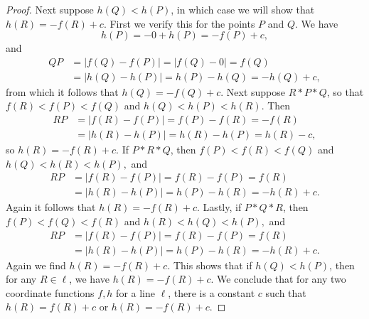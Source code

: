 \documentclass{article}
\begin{document}
\begin{proof}
  Next suppose $h(Q)<h(P)$, in which case we will show that $h(R)=-f(R)+c$. First we verify this for the points $P$ and $Q$. We have $$h(P)=-0+h(P)=-f(P)+c,$$ and 
  \begin{align*} QP&= |f(Q)-f(P)| =|f(Q)-0|= f(Q) \\
  &= |h(Q)-h(P)| =h(P)-h(Q)=-h(Q)+c,\end{align*}  from which it follows that $h(Q)=-f(Q)+c$. Next suppose $R*P*Q$, so that $f(R)<f(P)<f(Q)$ and $h(Q)<h(P)<h(R).$ Then
  \begin{align*} RP &=  |f(R)-f(P)| = f(P)-f(R) = -f(R) \\
  &=|h(R)-h(P)| = h(R)-h(P) =  h(R)-c, \end{align*}  so $h(R)=-f(R)+c$. If $P*R*Q$, then $f(P)<f(R)<f(Q)$ and $h(Q)<h(R)<h(P),$ and 
  \begin{align*} RP &=  |f(R)-f(P)| = f(R)-f(P) = f(R) \\
  &=|h(R)-h(P)| = h(P)-h(R) =  -h(R)+c.\end{align*} Again it follows that $h(R)=-f(R)+c$. Lastly, if $P*Q*R$, then $f(P)<f(Q)<f(R)$ and $h(R)<h(Q)<h(P),$ and
  \begin{align*} RP &=  |f(R)-f(P)| = f(R)-f(P) = f(R) \\
  &=|h(R)-h(P)| = h(P)-h(R) = -h(R)+c. \end{align*} Again we find $h(R)=-f(R)+c$. This shows that if $h(Q)<h(P)$, then for any $R\in\ell$, we have $h(R)=-f(R)+c$. We conclude that for any two coordinate functions $f,h$ for a line $\ell$, there is a constant $c$ such that $h(R)=f(R)+c$ or $h(R)=-f(R)+c.$

\end{proof}
\end{document}
